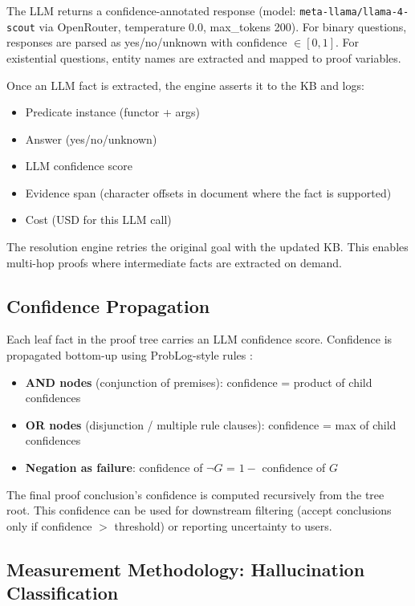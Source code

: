 \documentclass[11pt,letterpaper]{article}
\begin{document}
The LLM returns a confidence-annotated response (model: \texttt{meta-llama/llama-4-scout} via
OpenRouter, temperature 0.0, max\_tokens 200). For binary questions, responses are parsed as
yes/no/unknown with confidence $\in [0, 1]$. For existential questions, entity names are
extracted and mapped to proof variables.

Once an LLM fact is extracted, the engine asserts it to the KB and logs:
\begin{itemize}
  \item Predicate instance (functor + args)
  \item Answer (yes/no/unknown)
  \item LLM confidence score
  \item Evidence span (character offsets in document where the fact is supported)
  \item Cost (USD for this LLM call)
\end{itemize}

The resolution engine retries the original goal with the updated KB. This enables multi-hop
proofs where intermediate facts are extracted on demand.

\subsection{Confidence Propagation}

Each leaf fact in the proof tree carries an LLM confidence score. Confidence is propagated
bottom-up using ProbLog-style rules \citep{Raedt2007}:
\begin{itemize}
  \item \textbf{AND nodes} (conjunction of premises): confidence = product of child confidences
  \item \textbf{OR nodes} (disjunction / multiple rule clauses): confidence = max of child
    confidences
  \item \textbf{Negation as failure}: confidence of $\neg G$ = $1 -$ confidence of $G$
\end{itemize}

The final proof conclusion's confidence is computed recursively from the tree root. This
confidence can be used for downstream filtering (accept conclusions only if confidence $>$
threshold) or reporting uncertainty to users.

\subsection{Measurement Methodology: Hallucination Classification}
\end{document}
